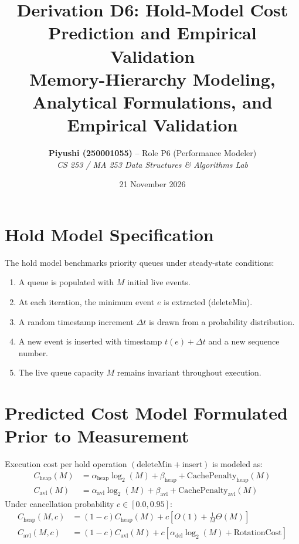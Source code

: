 \documentclass[11pt,a4paper]{article}
\title{\textbf{Derivation D6: Hold-Model Cost Prediction and Empirical Validation}\\
\large Memory-Hierarchy Modeling, Analytical Formulations, and Empirical Validation}
\author{\textbf{Piyushi (250001055)} -- Role P6 (Performance Modeler)\\
\textit{CS 253 / MA 253 Data Structures \& Algorithms Lab}}
\date{21 November 2026}
\begin{document}
\maketitle

\section{Hold Model Specification}
The hold model benchmarks priority queues under steady-state conditions:
\begin{enumerate}
    \item A queue is populated with $M$ initial live events.
    \item At each iteration, the minimum event $e$ is extracted ($\text{deleteMin}$).
    \item A random timestamp increment $\Delta t$ is drawn from a probability distribution.
    \item A new event is inserted with timestamp $t(e) + \Delta t$ and a new sequence number.
    \item The live queue capacity $M$ remains invariant throughout execution.
\end{enumerate}

\section{Predicted Cost Model Formulated Prior to Measurement}
Execution cost per hold operation $(\text{deleteMin} + \text{insert})$ is modeled as:
\begin{align}
C_{\text{heap}}(M) &= \alpha_{\text{heap}} \log_2(M) + \beta_{\text{heap}} + \text{CachePenalty}_{\text{heap}}(M) \\
C_{\text{avl}}(M)  &= \alpha_{\text{avl}} \log_2(M) + \beta_{\text{avl}} + \text{CachePenalty}_{\text{avl}}(M)
\end{align}
Under cancellation probability $c \in [0.0, 0.95]$:
\begin{align}
C_{\text{heap}}(M, c) &= (1 - c) C_{\text{heap}}(M) + c \left[ O(1) + \frac{1}{M}\Theta(M) \right] \\
C_{\text{avl}}(M, c)  &= (1 - c) C_{\text{avl}}(M) + c \left[ \alpha_{\text{del}} \log_2(M) + \text{RotationCost} \right]
\end{align}
\end{document}
